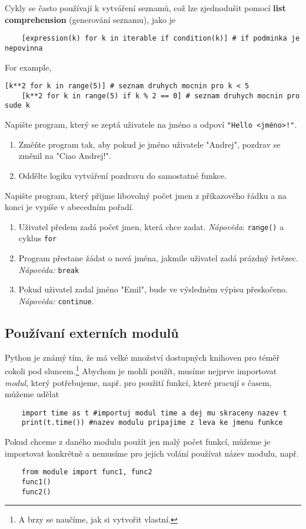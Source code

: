 Cykly se často používají k vytváření seznamů, což lze zjednodušit pomocí \textbf{list comprehension} (generování seznamu), jako je
\begin{lstlisting}
    [expression(k) for k in iterable if condition(k)] # if podminka je nepovinna
\end{lstlisting}
For example,
\begin{lstlisting}[caption=List comprehension.]
    [k**2 for k in range(5)] # seznam druhych mocnin pro k < 5
    [k**2 for k in range(5) if k % 2 == 0] # seznam druhych mocnin pro sude k
\end{lstlisting}

\begin{exercise}
Napište program, který se zeptá uživatele na jméno a odpoví \verb|"Hello <jméno>!"|.
\begin{enumerate}
    \item Změňte program tak, aby pokud je jméno uživatele "Andrej", pozdrav se změnil na "Ciao Andrej!".
    \item Oddělte logiku vytváření pozdravu do samostatné funkce.
\end{enumerate}%
\end{exercise}

\begin{exercise}
    Napište program, který přijme libovolný počet jmen z příkazového řádku a na konci je vypíše v abecedním pořadí.
    \begin{enumerate}
        \item Uživatel předem zadá počet jmen, která chce zadat. \emph{Nápověda}: \verb|range()| a cyklus \verb|for|
        \item Program přestane žádat o nová jména, jakmile uživatel zadá prázdný řetězec. \emph{Nápověda:} \verb|break|
        \item Pokud uživatel zadal jméno "Emil", bude ve výsledném výpisu přeskočeno. \emph{Nápověda:} \verb|continue|.
    \end{enumerate}
\end{exercise}

\subsection{Používaní externích modulů}
Python je známý tím, že má velké množství dostupných knihoven pro téměř cokoli pod sluncem.\footnote{A brzy se naučíme, jak si vytvořit vlastní.} Abychom je mohli použít, musíme nejprve importovat \emph{modul}, který potřebujeme, např. pro použití funkcí, které pracují s časem, můžeme udělat
\begin{lstlisting}
    import time as t #importuj modul time a dej mu skraceny nazev t
    print(t.time()) #nazev modulu pripajime z leva ke jmenu funkce
\end{lstlisting}
Pokud chceme z daného modulu použít jen malý počet funkcí, můžeme je importovat konkrétně a nemusíme pro jejich volání používat název modulu, např.
\begin{lstlisting}
    from module import func1, func2
    func1()
    func2()
\end{lstlisting}

